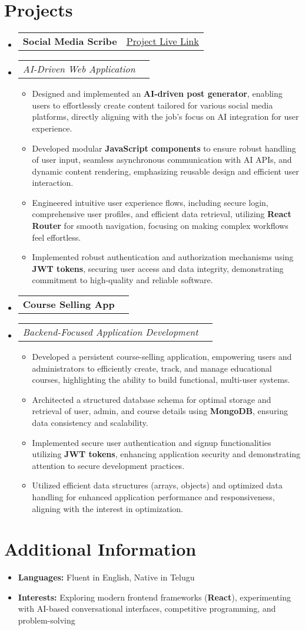 \documentclass[11pt]{article}
\makeatletter
\newcommand{\resumeSubheading}[2]{
    \item
    \begin{tabular*}{0.97\textwidth}[t]{l@{\extracolsep{\fill}}r}
        \textbf{#1} & #2 \\
    \end{tabular*}
}
\newcommand{\resumeSubSubheading}[2]{
    \item
    \begin{tabular*}{0.97\textwidth}[t]{l@{\extracolsep{\fill}}r}
        \textit{#1} & \textit{#2} \\
    \end{tabular*}
}
\newcommand{\resumeItem}[1]{\item\small{#1}}
\newcommand{\resumeSubHeadingListStart}{\begin{itemize}[leftmargin=0.15in, label={}]}
\newcommand{\resumeSubHeadingListEnd}{\end{itemize}}
\newcommand{\resumeItemListStart}{\begin{itemize}[leftmargin=0.2in]} %
\newcommand{\resumeItemListEnd}{\end{itemize}}
\makeatother
\begin{document}
\section*{Projects}
\resumeSubHeadingListStart
    \resumeSubheading
        {Social Media Scribe}{\href{https://example.com/social-media-scribe}{\underline{Project Live Link}}} %
        \resumeSubSubheading{\textit{AI-Driven Web Application}}{}
        \resumeItemListStart
            \resumeItem{Designed and implemented an \textbf{AI-driven post generator}, enabling users to effortlessly create content tailored for various social media platforms, directly aligning with the job's focus on AI integration for user experience.}
            \resumeItem{Developed modular \textbf{JavaScript components} to ensure robust handling of user input, seamless asynchronous communication with AI APIs, and dynamic content rendering, emphasizing reusable design and efficient user interaction.}
            \resumeItem{Engineered intuitive user experience flows, including secure login, comprehensive user profiles, and efficient data retrieval, utilizing \textbf{React Router} for smooth navigation, focusing on making complex workflows feel effortless.}
            \resumeItem{Implemented robust authentication and authorization mechanisms using \textbf{JWT tokens}, securing user access and data integrity, demonstrating commitment to high-quality and reliable software.}
        \resumeItemListEnd

    \resumeSubheading
        {Course Selling App}{} %
        \resumeSubSubheading{\textit{Backend-Focused Application Development}}{}
        \resumeItemListStart
            \resumeItem{Developed a persistent course-selling application, empowering users and administrators to efficiently create, track, and manage educational courses, highlighting the ability to build functional, multi-user systems.}
            \resumeItem{Architected a structured database schema for optimal storage and retrieval of user, admin, and course details using \textbf{MongoDB}, ensuring data consistency and scalability.}
            \resumeItem{Implemented secure user authentication and signup functionalities utilizing \textbf{JWT tokens}, enhancing application security and demonstrating attention to secure development practices.}
            \resumeItem{Utilized efficient data structures (arrays, objects) and optimized data handling for enhanced application performance and responsiveness, aligning with the interest in optimization.}
        \resumeItemListEnd
\resumeSubHeadingListEnd

\section*{Additional Information}
\resumeSubHeadingListStart
    \resumeItem{\textbf{Languages:} Fluent in English, Native in Telugu}
    \resumeItem{\textbf{Interests:} Exploring modern frontend frameworks (\textbf{React}), experimenting with AI-based conversational interfaces, competitive programming, and problem-solving}
\resumeSubHeadingListEnd
\end{document}
